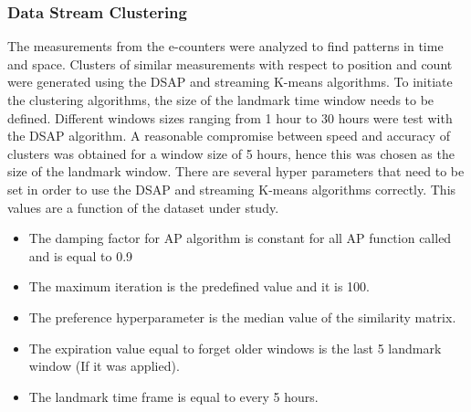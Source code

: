 \documentclass[../UNBThesis2.tex]{subfiles}
\begin{document}
\subsubsection{Data Stream Clustering}
The measurements from the e-counters were analyzed to find patterns in time and space. Clusters of similar measurements with respect to position and count were generated using the DSAP and streaming K-means algorithms. To initiate the clustering algorithms, the size of the landmark time window needs to be defined. Different windows sizes ranging from 1 hour to 30 hours were test with the DSAP algorithm. A reasonable compromise between speed and accuracy of clusters was obtained for a window size of 5 hours, hence this was chosen as the size of the landmark window.%
There are several hyper parameters that need to be set in order to use the DSAP and streaming K-means algorithms correctly. This values are a function of the dataset under study. 
\begin{itemize}
    \item The damping factor for AP algorithm is constant for all AP function called and is equal to 0.9
    \item The maximum iteration is the predefined value and it is 100.
    \item The preference hyperparameter is the median value of the similarity matrix.
    \item The expiration value equal to forget older windows is the last 5 landmark window (If it was applied). 
    \item The landmark time frame is equal to every 5 hours.
\end{itemize}




\end{document}
